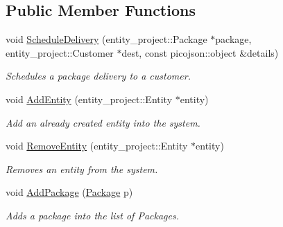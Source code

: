 \subsection*{Public Member Functions}
\begin{DoxyCompactItemize}
\item 
void \hyperlink{classcsci3081_1_1Scheduler_a06bd24b65f0c52349475eb6ccc661322}{Schedule\+Delivery} (entity\+\_\+project\+::\+Package $\ast$package, entity\+\_\+project\+::\+Customer $\ast$dest, const picojson\+::object \&details)
\begin{DoxyCompactList}\small\item\em Schedules a package delivery to a customer. \end{DoxyCompactList}\item 
\mbox{\label{classcsci3081_1_1Scheduler_ab3630723be8af0303181d92079772ef1}} 
void \hyperlink{classcsci3081_1_1Scheduler_ab3630723be8af0303181d92079772ef1}{Add\+Entity} (entity\+\_\+project\+::\+Entity $\ast$entity)
\begin{DoxyCompactList}\small\item\em Add an already created entity into the system. \end{DoxyCompactList}\item 
\mbox{\label{classcsci3081_1_1Scheduler_a50d8d379859c930d059ef488054b6aac}} 
void \hyperlink{classcsci3081_1_1Scheduler_a50d8d379859c930d059ef488054b6aac}{Remove\+Entity} (entity\+\_\+project\+::\+Entity $\ast$entity)
\begin{DoxyCompactList}\small\item\em Removes an entity from the system. \end{DoxyCompactList}\item 
\mbox{\label{classcsci3081_1_1Scheduler_aee6e6c093f5df70acbd8dac37f874876}} 
void \hyperlink{classcsci3081_1_1Scheduler_aee6e6c093f5df70acbd8dac37f874876}{Add\+Package} (\hyperlink{classcsci3081_1_1Package}{Package} p)
\begin{DoxyCompactList}\small\item\em Adds a package into the list of Packages. \end{DoxyCompactList}\item 
\mbox{\label{classcsci3081_1_1Scheduler_a06957515a2861f5d8213f15466c231a9}} 

\end{DoxyCompactItemize}
